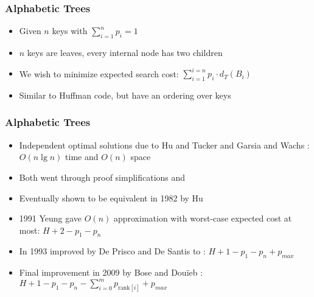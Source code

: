\documentclass{beamer}
\theoremstyle{plain}
\begin{document}
\begin{frame} \frametitle{Alphabetic Trees}
\begin{scriptsize}
\begin{center}
\end{center}
\end{scriptsize}

\begin{itemize}
\item Given $n$ keys with $\sum_{i=1}^{n} p_i = 1$

\item $n$ keys are leaves, every internal node has two children

\item We wish to minimize expected search cost: $\sum_{i=1}^{i=n} p_i \cdot d_T(B_i)$


\item Similar to Huffman code, but have an ordering over keys \cite{huffman1952method}

\end{itemize}

\end{frame}

\begin{frame}\frametitle{Alphabetic Trees}
\begin{itemize}

\item Independent optimal solutions due to Hu and Tucker \cite{hu1971optimal} and Garsia and Wachs \cite{garsia1977new}: $O(n \lg n)$ time and $O(n)$ space

\item Both went through proof simplifications \cite{knuth1973sorting, hu1973new, hu1979binary} and \cite{kingston1988new}

\item Eventually shown to be equivalent in 1982 by Hu \cite{Hu1982Book} 

\item 1991 Yeung gave $O(n)$ approximation with worst-case expected cost at most: $H + 2 - p_1-p_n$ \cite{yeung1991alphabetic}

\item In 1993 improved by De Prisco and De Santis to \cite{de1993binary}: $H+1-p_1-p_n+p_{max}$

\item Final improvement in 2009 by Bose and Dou\"{i}eb \cite{bose2009efficient}:
$H+1 -p_1-p_n-\sum_{i=0}^m p_{\text{rank}[i]} + p_{max}$


\end{itemize}
\end{frame}
\end{document}
